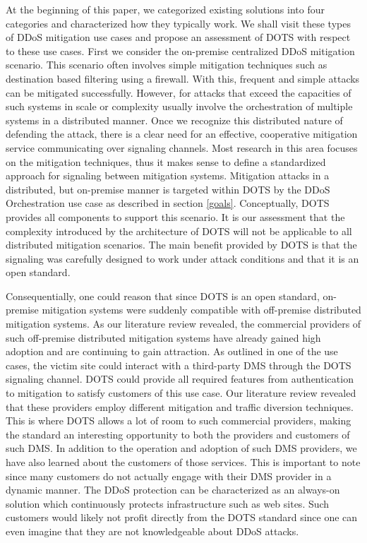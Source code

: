 At the beginning of this paper, we categorized existing solutions into four categories and characterized how they typically work. We shall visit these types of DDoS mitigation use cases and propose an assessment of DOTS with respect to these use cases. First we consider the on-premise centralized DDoS mitigation scenario. This scenario often involves simple mitigation techniques such as destination based filtering using a firewall. With this, frequent and simple attacks can be mitigated successfully. However, for attacks that exceed the capacities of such systems in scale or complexity usually involve the orchestration of multiple systems in a distributed manner. Once we recognize this distributed nature of defending the attack, there is a clear need for an effective, cooperative mitigation service communicating over signaling channels. Most research in this area focuses on the mitigation techniques, thus it makes sense to define a standardized approach for signaling between mitigation systems. Mitigation attacks in a distributed, but on-premise manner is targeted within DOTS by the DDoS Orchestration use case as described in section \ref{goals}. Conceptually, DOTS provides all components to support this scenario. It is our assessment that the complexity introduced by the architecture of DOTS will not be applicable to all distributed mitigation scenarios. The main benefit provided by DOTS is that the signaling was carefully designed to work under attack conditions and that it is an open standard. 

Consequentially, one could reason that since DOTS is an open standard, on-premise mitigation systems were suddenly compatible with off-premise distributed mitigation systems. As our literature review revealed, the commercial providers of such off-premise distributed mitigation systems have already gained high adoption and are continuing to gain attraction. As outlined in one of the use cases, the victim site could interact with a third-party DMS through the DOTS signaling channel. DOTS could provide all required features from authentication to mitigation to satisfy customers of this use case. Our literature review revealed that these providers employ different mitigation and traffic diversion techniques. This is where DOTS allows a lot of room to such commercial providers, making the standard an interesting opportunity to both the providers and customers of such DMS. In addition to the operation and adoption of such DMS providers, we have also learned about the customers of those services. This is important to note since many customers do not actually engage with their DMS provider in a dynamic manner. The DDoS protection can be characterized as an always-on solution which continuously protects infrastructure such as web sites. Such customers would likely not profit directly from the DOTS standard since one can even imagine that they are not knowledgeable about DDoS attacks.

